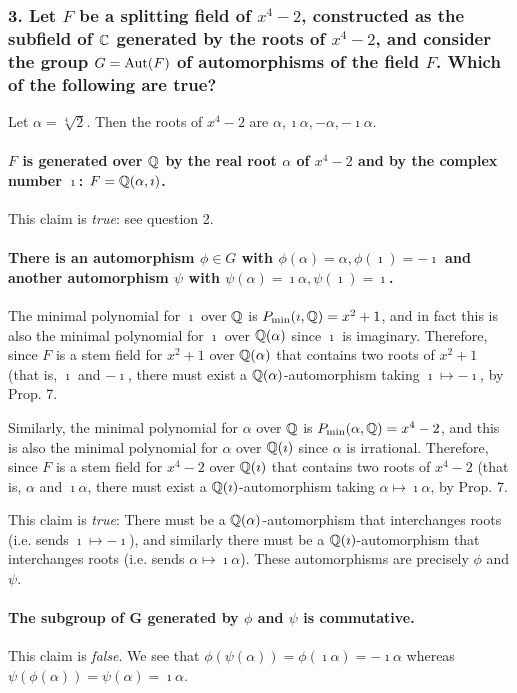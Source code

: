 \subsubsection*{3. Let $F$ be a splitting field of $x^4-2$, constructed as the subfield of $\mathbb{C}$ generated by the roots of $x^4-2$, and consider the group $G=\mathrm{Aut}(F)$ of automorphisms of the field $F$. Which of the following are true?}
Let $\alpha = \sqrt[4]{2}$. Then the roots of $x^4 - 2$ are $\alpha, \imath\alpha, -\alpha, -\imath\alpha$.

\paragraph*{$F$ is generated over $\mathbb{Q}$ by the real root $\alpha$ of $x^4 - 2$ and by the complex number $\imath$: $F = \mathbb{Q}(\alpha,\imath)$.}
This claim is \emph{true}: see question 2.

\paragraph*{There is an automorphism $\phi \in G$ with $\phi(\alpha) = \alpha, \phi(\imath) = -\imath$ and another automorphism $\psi$ with $\psi(\alpha) = \imath\alpha,\psi(\imath)=\imath$.}
The minimal polynomial for $\imath$ over $\mathbb{Q}$ is $P_{\min}(\imath, \mathbb{Q}) = x^2 + 1$, and in fact this is also the minimal polynomial for $\imath$ over $\mathbb{Q}(\alpha)$ since $\imath$ is imaginary. Therefore, since $F$ is a stem field for $x^2 + 1$ over $\mathbb{Q}(\alpha)$ that contains two roots of $x^2 + 1$ (that is, $\imath$ and $-\imath$, there must exist a $\mathbb{Q}(\alpha)$-automorphism taking $\imath \mapsto -\imath$, by Prop. 7.

Similarly, the minimal polynomial for $\alpha$ over $\mathbb{Q}$ is $P_{\min}(\alpha, \mathbb{Q}) = x^4 - 2$, and this is also the minimal polynomial for $\alpha$ over $\mathbb{Q}(\imath)$ since $\alpha$ is irrational. Therefore, since $F$ is a stem field for $x^4 - 2$ over $\mathbb{Q}(\imath)$ that contains two roots of $x^4 - 2$ (that is, $\alpha$ and $\imath\alpha$, there must exist a $\mathbb{Q}(\imath)$-automorphism taking $\alpha \mapsto \imath\alpha$, by Prop. 7.

This claim is \emph{true}: There must be a $\mathbb{Q}(\alpha)$-automorphism that interchanges roots (i.e. sends $\imath \mapsto -\imath$), and similarly there must be a $\mathbb{Q}(\imath)$-automorphism that interchanges roots (i.e. sends $\alpha \mapsto \imath\alpha$). These automorphisms are precisely $\phi$ and $\psi$.

\paragraph*{The subgroup of G generated by $\phi$ and $\psi$ is commutative.}
This claim is \emph{false}. We see that $\phi(\psi(\alpha)) = \phi(\imath\alpha) = -\imath\alpha$ whereas $\psi(\phi(\alpha)) = \psi(\alpha) = \imath\alpha$. 


